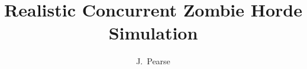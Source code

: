 \documentclass{article}
\begin{document}
\title{Realistic Concurrent Zombie Horde Simulation}
\author{J.~Pearse}
\maketitle

\ifx\HCode\undefined \else
{}    %
\fi                %

\tableofcontents




\end{document}
